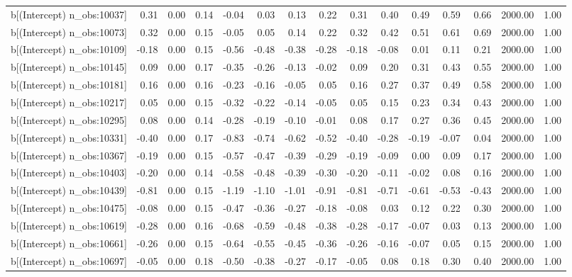\begin{table}[ht]
\begin{tabular}{rrrrrrrrrrrrrrr}
  b[(Intercept) n\_obs:10037] & 0.31 & 0.00 & 0.14 & -0.04 & 0.03 & 0.13 & 0.22 & 0.31 & 0.40 & 0.49 & 0.59 & 0.66 & 2000.00 & 1.00 \\ 
  b[(Intercept) n\_obs:10073] & 0.32 & 0.00 & 0.15 & -0.05 & 0.05 & 0.14 & 0.22 & 0.32 & 0.42 & 0.51 & 0.61 & 0.69 & 2000.00 & 1.00 \\ 
  b[(Intercept) n\_obs:10109] & -0.18 & 0.00 & 0.15 & -0.56 & -0.48 & -0.38 & -0.28 & -0.18 & -0.08 & 0.01 & 0.11 & 0.21 & 2000.00 & 1.00 \\ 
  b[(Intercept) n\_obs:10145] & 0.09 & 0.00 & 0.17 & -0.35 & -0.26 & -0.13 & -0.02 & 0.09 & 0.20 & 0.31 & 0.43 & 0.55 & 2000.00 & 1.00 \\ 
  b[(Intercept) n\_obs:10181] & 0.16 & 0.00 & 0.16 & -0.23 & -0.16 & -0.05 & 0.05 & 0.16 & 0.27 & 0.37 & 0.49 & 0.58 & 2000.00 & 1.00 \\ 
  b[(Intercept) n\_obs:10217] & 0.05 & 0.00 & 0.15 & -0.32 & -0.22 & -0.14 & -0.05 & 0.05 & 0.15 & 0.23 & 0.34 & 0.43 & 2000.00 & 1.00 \\ 
  b[(Intercept) n\_obs:10295] & 0.08 & 0.00 & 0.14 & -0.28 & -0.19 & -0.10 & -0.01 & 0.08 & 0.17 & 0.27 & 0.36 & 0.45 & 2000.00 & 1.00 \\ 
  b[(Intercept) n\_obs:10331] & -0.40 & 0.00 & 0.17 & -0.83 & -0.74 & -0.62 & -0.52 & -0.40 & -0.28 & -0.19 & -0.07 & 0.04 & 2000.00 & 1.00 \\ 
  b[(Intercept) n\_obs:10367] & -0.19 & 0.00 & 0.15 & -0.57 & -0.47 & -0.39 & -0.29 & -0.19 & -0.09 & 0.00 & 0.09 & 0.17 & 2000.00 & 1.00 \\ 
  b[(Intercept) n\_obs:10403] & -0.20 & 0.00 & 0.14 & -0.58 & -0.48 & -0.39 & -0.30 & -0.20 & -0.11 & -0.02 & 0.08 & 0.16 & 2000.00 & 1.00 \\ 
  b[(Intercept) n\_obs:10439] & -0.81 & 0.00 & 0.15 & -1.19 & -1.10 & -1.01 & -0.91 & -0.81 & -0.71 & -0.61 & -0.53 & -0.43 & 2000.00 & 1.00 \\ 
  b[(Intercept) n\_obs:10475] & -0.08 & 0.00 & 0.15 & -0.47 & -0.36 & -0.27 & -0.18 & -0.08 & 0.03 & 0.12 & 0.22 & 0.30 & 2000.00 & 1.00 \\ 
  b[(Intercept) n\_obs:10619] & -0.28 & 0.00 & 0.16 & -0.68 & -0.59 & -0.48 & -0.38 & -0.28 & -0.17 & -0.07 & 0.03 & 0.13 & 2000.00 & 1.00 \\ 
  b[(Intercept) n\_obs:10661] & -0.26 & 0.00 & 0.15 & -0.64 & -0.55 & -0.45 & -0.36 & -0.26 & -0.16 & -0.07 & 0.05 & 0.15 & 2000.00 & 1.00 \\ 
  b[(Intercept) n\_obs:10697] & -0.05 & 0.00 & 0.18 & -0.50 & -0.38 & -0.27 & -0.17 & -0.05 & 0.08 & 0.18 & 0.30 & 0.40 & 2000.00 & 1.00 \\ 

\end{tabular}
\end{table}
